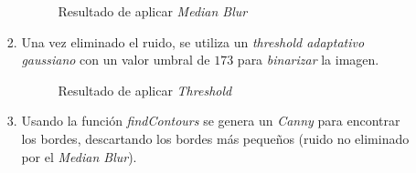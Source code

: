 \begin{enumerate}
\begin{enumerate}[label*=\arabic*.]
\begin{enumerate}[label*=\arabic*.]
      \begin{figure}[H]
        \caption{Resultado de aplicar \emph{Median Blur}}
        \centering \setlength\fboxsep{0pt} \setlength\fboxrule{0.5pt}
      \end{figure}

    \item Una vez eliminado el ruido, se utiliza un \emph{threshold
        adaptativo
        gaussiano} con
      un valor umbral de $173$ para \emph{binarizar} la imagen.

      \begin{figure}[H]
        \caption{Resultado de aplicar \emph{Threshold}}
        \centering \setlength\fboxsep{0pt} \setlength\fboxrule{0.5pt}
      \end{figure}

    \item Usando la función
      \emph{findContours} se genera un
      \emph{Canny} para encontrar los
      bordes, descartando los bordes más pequeños (ruido no eliminado
      por el \emph{Median Blur}).


\end{enumerate}
\end{enumerate}
\end{enumerate}
